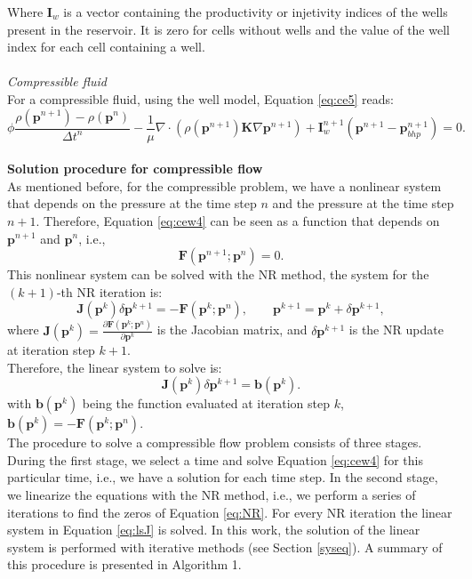 \documentclass[12pt]{article}
\begin{document}
Where $\mathbf{I}_w$ is a vector containing the productivity or injetivity indices of the wells present in the reservoir. It is zero for cells without wells and the value of the well index for each cell containing a well.\\\\ 
\emph{Compressible fluid}\\
For a compressible fluid, using the well model, Equation \eqref{eq:ce5} reads:
\begin{equation}\label{eq:cew4}
 {\phi}\frac{{\rho}(\mathbf{p}^{n+1})
 -{\rho}(\mathbf{p}^{n})}{\Delta t^n}
 -\frac{1}{\mu}\nabla \cdot ({\rho}(\mathbf{p}^{n+1}) 
 \mathbf{K}\nabla\mathbf{p}^{n+1})+\mathbf{I}_w^{n+1}(\mathbf{p}^{n+1}-\mathbf{p}_{bhp}^{n+1})=0.
\end{equation}\\
\textbf{Solution procedure for compressible flow}\\
As mentioned before, for the compressible problem, we have a nonlinear system that depends on the pressure at the time step $n$ and the pressure at the time step $n+1$. Therefore, Equation \eqref{eq:cew4} can be seen as a function that depends on $\mathbf{p}^{n+1}$ and $\mathbf{p}^{n}$, i.e.,
\begin{equation}\label{eq:NR}
 \mathbf{F}(\mathbf{p}^{n+1};\mathbf{p}^n)=0.
\end{equation}
This nonlinear system can be solved with the NR method, the system for the $(k+1)$-th NR iteration is:
$$\mathbf{J}(\mathbf{p}^k)\delta\mathbf{p}^{k+1}=-\mathbf{F}(\mathbf{p}^k;\mathbf{p}^n),
\qquad \mathbf{p}^{k+1}=\mathbf{p}^k+\delta \mathbf{p}^{k+1},$$
where $\mathbf{J}(\mathbf{p}^k)=\frac{\partial \mathbf{F}(\mathbf{p}^k;\mathbf{p}^n)}{\partial \mathbf{p}^k}$ is the 
Jacobian matrix, and $\delta \mathbf{p}^{k+1}$ is the NR update at iteration step $k+1$.\\
Therefore, the linear system to solve is:\\
\begin{equation}\label{eq:lsJ}
\mathbf{J}(\mathbf{p}^k)\delta \mathbf{p}^{k+1}=\mathbf{b}(\mathbf{p}^k).
\end{equation}
with $\mathbf{b}(\mathbf{p}^k)$ being the function evaluated at iteration step $k$, $\mathbf{b}(\mathbf{p}^k)=-\mathbf{F}(\mathbf{p}^k;\mathbf{p}^n)$.\\
The procedure to solve a compressible flow problem consists of three stages. During the first stage, we select a 
time and solve Equation \eqref{eq:cew4} for this particular time, i.e., we have a solution for each time step. In the second stage, 
we linearize the equations with the NR method, i.e., we perform a series of iterations to find the 
zeros of Equation \eqref{eq:NR}. For every NR iteration the linear system in Equation \eqref{eq:lsJ} is solved. In this work, the solution of the linear system is performed with iterative methods (see Section \ref{syseq}). A summary of 
this procedure is presented in Algorithm 1.
\end{document}
